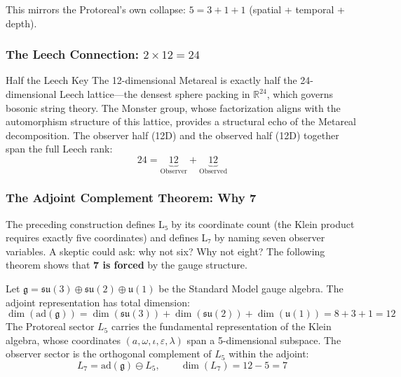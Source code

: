 This mirrors the Protoreal's own collapse: $5 = 3 + 1 + 1$ (spatial + temporal + depth).

\subsubsection{The Leech Connection: $2 \times 12 = 24$}

\begin{metarealbox}{Half the Leech Key}
The 12-dimensional Metareal is exactly half the 24-dimensional Leech lattice---the densest sphere packing in $\mathbb{R}^{24}$, which governs bosonic string theory. The Monster group, whose factorization aligns with the automorphism structure of this lattice, provides a structural echo of the Metareal decomposition. The observer half (12D) and the observed half (12D) together span the full Leech rank:
\begin{equation}
    24 = \underbrace{12}_{\text{Observer}} + \underbrace{12}_{\text{Observed}}
\end{equation}
\end{metarealbox}

\subsubsection{The Adjoint Complement Theorem: Why 7}

The preceding construction defines L₅ by its coordinate count (the Klein product requires exactly five coordinates) and defines L₇ by naming seven observer variables. A skeptic could ask: why not six? Why not eight? The following theorem shows that \textbf{7 is forced} by the gauge structure.

\begin{theorem}\label{thm:adjoint_complement}
Let $\mathfrak{g} = \mathfrak{su}(3) \oplus \mathfrak{su}(2) \oplus \mathfrak{u}(1)$ be the Standard Model gauge algebra. The adjoint representation has total dimension:
$$\dim(\mathrm{ad}(\mathfrak{g})) = \dim(\mathfrak{su}(3)) + \dim(\mathfrak{su}(2)) + \dim(\mathfrak{u}(1)) = 8 + 3 + 1 = 12$$
The Protoreal sector $L_5$ carries the fundamental representation of the Klein algebra, whose coordinates $(a, \omega, \iota, \varepsilon, \lambda)$ span a 5-dimensional subspace. The observer sector is the orthogonal complement of $L_5$ within the adjoint:
\begin{equation}
    L_7 = \mathrm{ad}(\mathfrak{g}) \ominus L_5, \qquad \dim(L_7) = 12 - 5 = 7
\end{equation}
\end{theorem}

